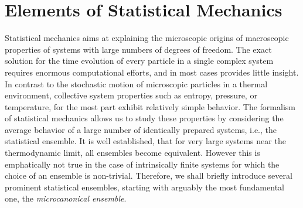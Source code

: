 \documentclass[12pt]{report}
\begin{document}
\chapter{Elements of Statistical Mechanics}
\label{chap:elements_of_stat_mech}
Statistical mechanics aims at explaining the microscopic origins of macroscopic properties of systems with large numbers of degrees of freedom. The exact solution for the time evolution of every particle in a single complex system requires enormous computational efforts, and in most cases provides little insight. In contrast to the stochastic motion of microscopic particles in a thermal environment, collective system properties such as entropy, pressure, or temperature, for the most part exhibit relatively simple behavior. The formalism of statistical mechanics allows us to study these properties by considering the average behavior of a large number of identically prepared systems, i.e., the statistical ensemble. It is well established, that for very large systems near the thermodynamic limit, all ensembles become equivalent. However this is emphatically not true in the case of intrinsically finite systems for which the choice of an ensemble is non-trivial\cite{Bachmann2014}. Therefore, we shall briefly introduce several prominent statistical ensembles, starting with arguably the most fundamental one, the \textit{microcanonical ensemble}.
\end{document}

